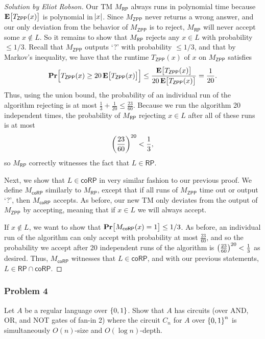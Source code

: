 \documentclass{article}
\newenvironment{solution}[1]{\begin{proof}[Solution by #1]}{\end{proof}}
\newcommand{\ZPP}{\mathsf{ZPP}}
\newcommand{\RP}{\mathsf{RP}}
\newcommand{\coRP}{\mathsf{coRP}}
\begin{document}
\begin{solution}{Eliot Robson}
    Our TM \(M_{\RP}\) always runs in polynomial time because \(\Exp{T_{\ZPP}(x)}\) is polynomial in \(\abs{x}\). Since \(M_{\ZPP}\) never returns a wrong answer, and our only deviation from the behavior of \(M_{\ZPP}\) is to reject, \(M_{\RP}\) will never accept some \(x \notin L\). So it remains to show that \(M_{\RP}\) rejects any \(x \in L\) with probability \(\leq 1/3\). Recall that \(M_{\ZPP}\) outputs `?' with probability \(\leq 1/3\), and that by Markov's inequality, we have that the runtime \(T_{\ZPP}(x)\) of \(x\) on \(M_{\ZPP}\) satisfies
    \[
        \Prob{T_{\ZPP}(x) \geq 20 \Exp{T_{\ZPP}(x)}}
        \leq%
        \frac{\Exp{T_{\ZPP}(x)}}{20 \Exp{T_{\ZPP}(x)}}
        =%
        \frac{1}{20}.
    \]
    Thus, using the union bound, the probability of an individual run of the algorithm rejecting is at most \(\frac{1}{3} + \frac{1}{20} \leq \frac{23}{60}\). Because we run the algorithm 20 independent times, the probability of \(M_{\RP}\) rejecting \(x \in L\) after all of these runs is at most
    \[
        \del{\frac{23}{60}}^{20} < \frac{1}{3},
    \]
    so \(M_{\RP}\) correctly witnesses the fact that \(L \in \RP\).
    
    Next, we show that \(L \in \coRP\) in very similar fashion to our previous proof. We define \(M_{\coRP}\) similarly to \(M_{\RP}\), except that if all runs of \(M_{\ZPP}\) time out or output `?', then \(M_{\coRP}\) accepts. As before, our new TM only deviates from the output of \(M_{\ZPP}\) by accepting, meaning that if \(x \in L\) we will always accept.
    
    If \(x \notin L\), we want to show that \(\Prob{M_{\coRP}(x) = 1} \leq 1/3\). As before, an individual run of the algorithm can only accept with probability at most \(\frac{23}{60}\), and so the probability we accept after 20 independent runs of the algorithm is \(\del{\frac{23}{60}}^{20} < \frac{1}{3}\) as desired. Thus, \(M_{\coRP}\) witnesses that \(L \in \coRP\), and with our previous statements, \(L \in \RP \cap \coRP\).
\end{solution}

\subsubsection{Problem 4}
Let \(A\) be a regular language over \(\set{0,1}\). Show that \(A\) has circuits (over AND, OR, and NOT gates of fan-in 2) where the circuit \(C_n\)  for \(A\) over \(\set{0,1}^n\) is simultaneously \(O(n)\)-size and \(O(\log n)\)-depth.
\end{document}
